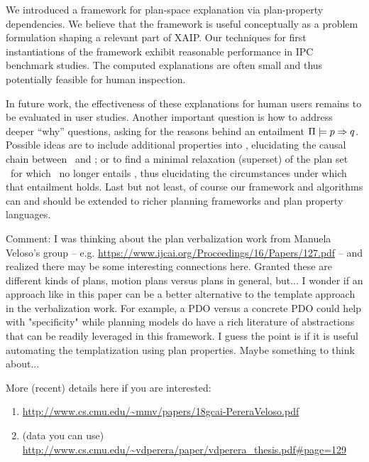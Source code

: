 We introduced a framework for plan-space explanation via plan-property
dependencies. We believe that the framework is useful conceptually as
a problem formulation shaping a relevant part of XAIP. Our techniques
for first instantiations of the framework exhibit reasonable
performance in IPC benchmark studies. The computed explanations are
often small and thus potentially feasible for human inspection.



%
%
%

In future work, the effectiveness of these explanations for human
users remains to be evaluated in user studies. Another important
question is how to address deeper ``why'' questions, asking for the
reasons behind an entailment
$\Pi \models p \Rightarrow q$. Possible ideas are to include
additional properties into \props, elucidating the causal chain
between \prop\ and \propq; or to find a minimal relaxation (superset)
of the plan set \plans\ for which \prop\ no longer entails \propq,
thus elucidating the circumstances under which that entailment
holds. Last but not least, of course our framework and algorithms can
and should be extended to richer planning frameworks and plan property
languages.




	Comment: I was thinking about the plan verbalization work from Manuela Veloso's group 
	-- e.g. \url{https://www.ijcai.org/Proceedings/16/Papers/127.pdf} 
	-- and realized there may be some interesting connections here. 
	Granted these are different kinds of plans, motion plans versus plans in general, 
	but...  I wonder if an approach like in this paper can be a better alternative 
	to the template approach in the verbalization work. For example, a PDO versus 
	a concrete PDO could help with "specificity" while planning models do have 
	a rich literature of abstractions that can be readily leveraged in this framework. 
	I guess the point is if it is useful automating the templatization using plan properties. 
	Maybe something to think about... 

	More (recent) details here if you are interested:
	\begin{enumerate}
		\item \url{http://www.cs.cmu.edu/~mmv/papers/18gcai-PereraVeloso.pdf}
		\item (data you can use) \url{http://www.cs.cmu.edu/~vdperera/paper/vdperera_thesis.pdf#page=129}
	\end{enumerate}
